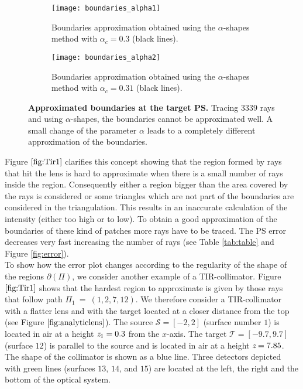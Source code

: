 \begin{figure}[h]
\centering
\begin{subfigure}{.48\textwidth}
  \centering
  \texttt{[image: boundaries\_alpha1]}
  \caption{Boundaries approximation obtained using the $\alpha$-shapes method with $\alpha_c = 0.3$ (black lines).}
\end{subfigure}
\hfill
\begin{subfigure}{.48\textwidth}
  \centering
  \texttt{[image: boundaries\_alpha2]}
  \caption{Boundaries approximation obtained using the $\alpha$-shapes method with $\alpha_c = 0.31$ (black lines).}
\end{subfigure}
\caption{\textbf{Approximated boundaries at the target PS.} Tracing $3339$ rays and using $\alpha$-shapes, the boundaries cannot be approximated well. 
A small change of the parameter $\alpha$ leads to a completely different approximation of the boundaries.}
\label{fig:Tir1}
\end{figure}
Figure $\ref{fig:Tir1}$ clarifies this concept showing that the region formed by rays that hit the lens is hard to approximate when there is a small number of rays inside the region. Consequently either a region bigger than the area covered by the rays is considered or some triangles which are not part of the boundaries are considered in the triangulation. This results in an inaccurate calculation of the intensity (either too high or to low). To obtain a good approximation of the boundaries of these kind of patches more rays have to be traced. The PS error decreases very fast increasing the number of rays (see Table
 \ref{tab:table} and Figure \ref{fig:error}).
 \\\indent To show how the error plot changes according to the regularity of the shape of the regions $\partial$$(\Pi)$, we consider another example of a TIR-collimator.
 Figure $\ref{fig:Tir1}$ shows that the hardest region to approximate is given by those rays that follow path $\Pi_1 ~=~ (1,2,7,12)$.
 We therefore consider a TIR-collimator with a flatter lens and with the target located at a closer distance from the top (see Figure $\ref{fig:analyticlens}$). 
The source $\mathcal{S}= [-2,2]$ (surface number $1$) is located in air at a height $\textit{z}_1 = 0.3$ from the $x$-axis.
       The target $\mathcal{T}= [-9.7, 9.7]$ (surface $12$) is parallel to the source and is located in air at a height $ \textit{z}= 7.85$.
       The shape of the collimator is shown as a blue line.
       Three detectors depicted with green lines (surfaces $13$, $14$, and $15$) are located at the left, the right and the bottom of the optical system.
